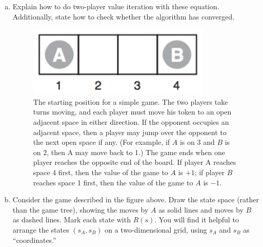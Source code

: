 \documentclass[a4paper]{article}
\begin{document}
\begin{enumerate}[(a)]
\vspace{8em}

\item Explain how to do two-player value iteration with these equation. Additionally, state how to check whether the algorithm has converged. 

\newpage


\begin{center}
\begin{figure}[h!]
\centering
\includegraphics[width=.25\textwidth]{figs/small-2-player}
\caption{The starting position for a simple game. The two players take turns moving, and each player must move his token to an open adjacent space in either direction. If the opponent occupies an adjacent space, then a player may jump over the opponent to the next open space if any. (For example, if $A$ is on $3$ and $B$ is on $2$, then A may move back to 1.) The game ends when one player reaches the opposite end of the board. If player A reaches space 4 first, then the value of the game to $A$ is $+1$; if player $B$ reaches space 1 first, then the value of the game to $A$ is $−1$.}
\end{figure}
\end{center}

\item Consider the game described in the figure above. Draw the state space (rather than the game tree), showing the moves by $A$ as solid lines and moves by $B$ as dashed lines. Mark each state with $R(s)$. You will find it helpful to arrange the states $(s_A,s_B)$ on a two-dimensional grid, using $s_A$ and $s_B$ as “coordinates.”


\end{enumerate}
\end{document}
